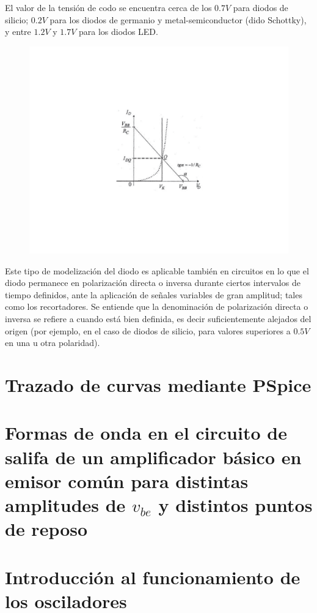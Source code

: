 \documentclass{book} %
\theoremstyle{definition}
\begin{document}
\begin{appendices}
El valor de la tensión de codo se encuentra cerca de los $0.7V$ para diodos de silicio; $0.2V$ para los diodos de germanio y metal-semiconductor (dido Schottky), y entre $1.2V$ y $1.7V$ para los diodos LED.
\begin{figure}[!htbp]
    \centering
    \includegraphics[scale=1]{figurac07.pdf}
    \caption{}
    \label{fig:c.7}
\end{figure}


Este tipo de modelización del diodo es aplicable también en circuitos en lo que el diodo permanece en polarización directa o inversa durante ciertos intervalos de tiempo definidos, ante la aplicación de señales variables de gran amplitud; tales como los recortadores. Se entiende que la denominación de polarización directa o inversa se refiere a cuando está bien definida, es decir suficientemente alejados del origen (por ejemplo, en el caso de diodos de silicio, para valores superiores a $0.5V$ en una u otra polaridad).






\chapter{Trazado de curvas mediante PSpice}
\chapter{Formas de onda en el circuito de salifa de un amplificador básico en emisor común para distintas amplitudes de $v_{be}$ y distintos puntos de reposo}
\chapter{Introducción al funcionamiento de los osciladores}

\end{appendices}
\end{document}

